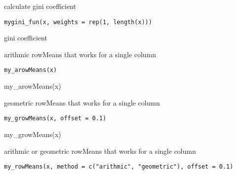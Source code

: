 \documentclass[a4paper]{book}
\begin{document}
%
\begin{Description}\relax
calculate gini coefficient
\end{Description}
%
\begin{Usage}
\begin{verbatim}
mygini_fun(x, weights = rep(1, length(x)))
\end{verbatim}
\end{Usage}
%
\begin{Value}
gini coefficient
\end{Value}
%
\begin{Description}\relax
arithmic rowMeans that works for a single column
\end{Description}
%
\begin{Usage}
\begin{verbatim}
my_arowMeans(x)
\end{verbatim}
\end{Usage}
%
\begin{Examples}
\begin{ExampleCode}
    my_arowMeans(x)
\end{ExampleCode}
\end{Examples}
%
\begin{Description}\relax
geometric rowMeans that works for a single column
\end{Description}
%
\begin{Usage}
\begin{verbatim}
my_growMeans(x, offset = 0.1)
\end{verbatim}
\end{Usage}
%
\begin{Examples}
\begin{ExampleCode}
    my_growMeans(x)
\end{ExampleCode}
\end{Examples}
%
\begin{Description}\relax
arithmic or geometric rowMeans that works for a single column
\end{Description}
%
\begin{Usage}
\begin{verbatim}
my_rowMeans(x, method = c("arithmic", "geometric"), offset = 0.1)
\end{verbatim}
\end{Usage}
\end{document}
